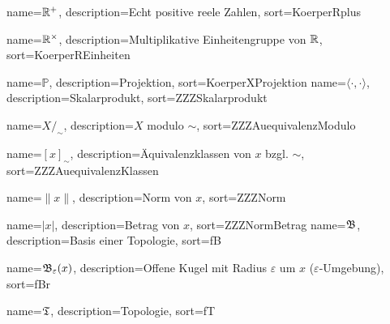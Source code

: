 {
  name={\ensuremath{\mdr^+}},
  description={Echt positive reele Zahlen},
  sort=KoerperRplus
}

{
  name={\ensuremath{\mdr^\times}},
  description={Multiplikative Einheitengruppe von $\mathbb{R}$},
  sort=KoerperREinheiten
}

{
  name={\ensuremath{\mathbb{P}}},
  description={Projektion},
  sort=KoerperXProjektion
}
{
  name={\ensuremath{\langle \cdot , \cdot \rangle}},
  description={Skalarprodukt},
  sort=ZZZSkalarprodukt
}

{
  name={\ensuremath{X /_\sim}},
  description={$X$ modulo $\sim$},
  sort=ZZZAuequivalenzModulo
}

{
  name={\ensuremath{[x]_\sim}},
  description={Äquivalenzklassen von $x$ bzgl. $\sim$},
  sort=ZZZAuequivalenzKlassen
}

{
  name={\ensuremath{\| x \|}},
  description={Norm von $x$},
  sort=ZZZNorm
}

{
  name={\ensuremath{| x |}},
  description={Betrag von $x$},
  sort=ZZZNormBetrag
}
{
  name={\ensuremath{\fB}},
  description={Basis einer Topologie},
  sort=fB
}

{
  name={\ensuremath{\fB_\varepsilon(x)}},
  description={Offene Kugel mit Radius $\varepsilon$ um $x$ ($\varepsilon$-Umgebung)},
  sort=fBr
}

{
  name={\ensuremath{\fT}},
  description={Topologie},
  sort=fT
}


\renewcommand*{\glossaryname}{\glossarName}

\glsaddall
\printglossaries

